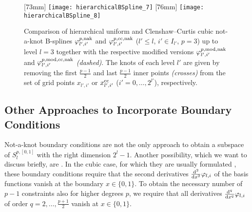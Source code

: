 \begin{figure}
  [73mm]{%
    \texttt{[image: hierarchicalBSpline\_7]}%
  }%
  \hfill
  [76mm]{%
    \texttt{[image: hierarchicalBSpline\_8]}%
  }%
  \caption{%
    Comparison of hierarchical uniform and Clenshaw--Curtis cubic not-a-knot
    B-splines $\varphi_{l',i'}^{p,\mathrm{nak}}$ and
    $\varphi_{l',i'}^{p,\mathrm{cc},\mathrm{nak}}$
    ($l ' \le l$, $i' \in I_{l'}$, $p = 3$) up to level $l = 3$
    together with the respective modified versions
    $\varphi_{l',i'}^{p,\mathrm{mod},\mathrm{nak}}$ and
    $\varphi_{l',i'}^{p,\mathrm{mod},\mathrm{cc},\mathrm{nak}}$
    \emph{(dashed)}.
    The knots of each level $l'$ are given by removing the
    first $\tfrac{p-1}{2}$ and last $\tfrac{p-1}{2}$
    inner points \emph{(crosses)}
    from the set of grid points $x_{l',i'}$ or
    $x_{l',i'}^{\mathrm{cc}}$
    ($i' = 0, \dotsc, 2^{l'}$), respectively.%
  }%
\end{figure}



\subsection{Other Approaches to Incorporate Boundary Conditions}
\label{sec:324naturalBoundary}

Not-a-knot boundary conditions are not the only approach
to obtain a subspace of $S_l^{p,[0,1]}$ with the right dimension $2^l - 1$.
Another possibility, which we want to discuss briefly, are
.
In the cubic case, for which they are usually formulated
\cite{Hoellig13Approximation},
these boundary conditions require that the
second derivatives $\frac{\mathop{}\!\mathrm{d}^2}{\mathop{}\!\mathrm{d}{}x^2} \varphi_{l,i}$ of the
basis functions vanish at the boundary $x \in \{0, 1\}$.
To obtain the necessary number of $p - 1$ constraints also
for higher degrees $p$,
we require that all derivatives
$\frac{\mathop{}\!\mathrm{d}^q}{\mathop{}\!\mathrm{d}{}x^q} \varphi_{l,i}$ of order
$q = 2, \dotsc, \tfrac{p+1}{2}$ vanish at $x \in \{0, 1\}$.

